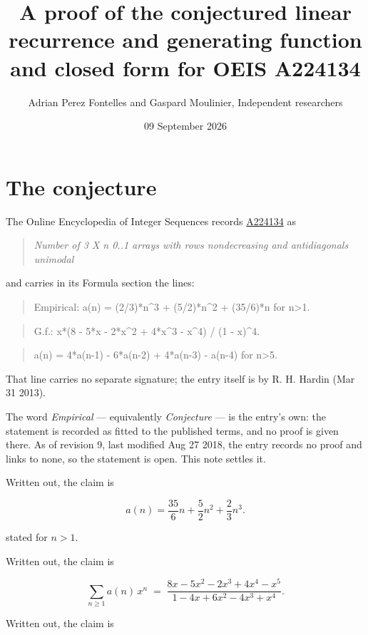 \documentclass[11pt]{article}
\title{A proof of the conjectured linear recurrence and generating function and closed form for OEIS A224134}
\author{Adrian Perez Fontelles and Gaspard Moulinier, Independent researchers}
\date{09 September 2026}
\theoremstyle{definition}
\begin{document}
\maketitle
\section{The conjecture}

The Online Encyclopedia of Integer Sequences records \href{https://oeis.org/A224134}{A224134} as

\begin{quote}\itshape Number of 3 X n 0..1 arrays with rows nondecreasing and antidiagonals unimodal\end{quote}

and carries in its Formula section the lines:

\begin{quote}\ttfamily Empirical: a(n) = (2/3)*n\textasciicircum{}3 + (5/2)*n\textasciicircum{}2 + (35/6)*n for n>1.\end{quote}

\begin{quote}\ttfamily G.f.: x*(8 - 5*x - 2*x\textasciicircum{}2 + 4*x\textasciicircum{}3 - x\textasciicircum{}4) / (1 - x)\textasciicircum{}4.\end{quote}

\begin{quote}\ttfamily a(n) = 4*a(n-1) - 6*a(n-2) + 4*a(n-3) - a(n-4) for n>5.\end{quote}

That line carries no separate signature; the entry itself is by R. H. Hardin (Mar 31 2013).

The word {\itshape Empirical} --- equivalently {\itshape Conjecture} --- is the entry's own: the statement is recorded as fitted to the published terms, and no proof is given there. As of revision 9, last modified Aug 27 2018, the entry records no proof and links to none, so the statement is open. This note settles it.

Written out, the claim is

\[a(n) = \frac{35}{6}n + \frac{5}{2}n^{2} + \frac{2}{3}n^{3}.\]

stated for $n > 1$.

Written out, the claim is

\[\sum_{n \ge 1} a(n)\,x^n \;=\; \frac{8x - 5x^{2} - 2x^{3} + 4x^{4} - x^{5}}{1 - 4x + 6x^{2} - 4x^{3} + x^{4}}.\]

Written out, the claim is
\end{document}
